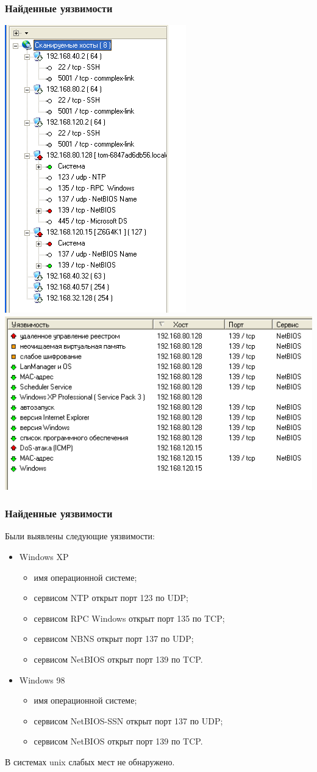 \documentclass[9pt, compress]{beamer}
\begin{document}
\begin{frame}
\frametitle{Найденные уязвимости}
\begin{center}  
	\includegraphics[width=.35\textwidth]{img/5}
	\includegraphics[width=.63\textwidth]{img/6}
\end{center}
\end{frame}


\begin{frame}
\frametitle{Найденные уязвимости}
Были выявлены следующие уязвимости:
\begin{itemize}
\item Windows XP
\begin{itemize}
\item имя операционной системе;
\item сервисом NTP открыт порт 123 по UDP;
\item сервисом RPC Windows открыт порт 135 по TCP;
\item сервисом NBNS открыт порт 137 по UDP;
\item сервисом NetBIOS открыт порт 139 по TCP.
\end{itemize}
\item Windows 98
\begin{itemize}
\item имя операционной системе;
\item сервисом NetBIOS-SSN открыт порт 137 по UDP;
\item сервисом NetBIOS открыт порт 139 по TCP.
\end{itemize}
\end{itemize}
В системах unix слабых мест не обнаружено.
\end{frame}
\end{document}
